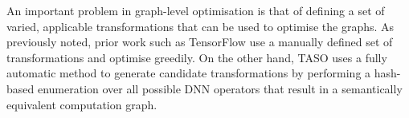An important problem in graph-level optimisation is that of defining a set of varied, applicable transformations that can be used to optimise the graphs. As previously noted, prior work such as TensorFlow use a manually defined set of transformations and optimise greedily. On the other hand, TASO uses a fully automatic method to generate candidate transformations by performing a hash-based enumeration over all possible DNN operators that result in a semantically equivalent computation graph.

\begin{figure}[ht]
  \sbox{}
  \setlength{\twosubht}{\ht\twosubbox}
  

\end{figure}

